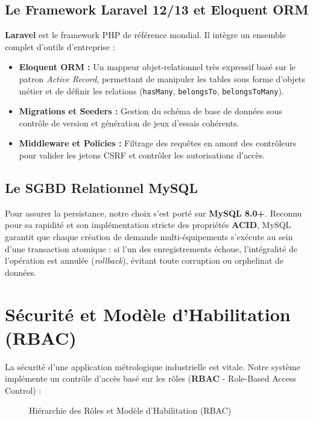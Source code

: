 \documentclass{bts-report}
\begin{document}
\subsection{Le Framework Laravel 12/13 et Eloquent ORM}
\textbf{Laravel} est le framework PHP de r\'ef\'erence mondial. Il int\`egre un ensemble complet d'outils d'entreprise :
\begin{itemize}
  \item \textbf{Eloquent ORM :} Un mappeur objet-relationnel tr\`es expressif bas\'e sur le patron \textit{Active Record}, permettant de manipuler les tables sous forme d'objets m\'etier et de d\'efinir les relations (\texttt{hasMany}, \texttt{belongsTo}, \texttt{belongsToMany}).
  \item \textbf{Migrations et Seeders :} Gestion du sch\'ema de base de donn\'ees sous contr\^ole de version et g\'en\'eration de jeux d'essais coh\'erents.
  \item \textbf{Middleware et Policies :} Filtrage des requ\^etes en amont des contr\^oleurs pour valider les jetons CSRF et contr\^oler les autorisations d'acc\`es.
\end{itemize}

\subsection{Le SGBD Relationnel MySQL}
Pour assurer la persistance, notre choix s'est port\'e sur \textbf{MySQL 8.0+}. Reconnu pour sa rapidit\'e et son impl\'ementation stricte des propri\'et\'es \textbf{ACID}, MySQL garantit que chaque cr\'eation de demande multi-\'equipements s'ex\'ecute au sein d'une transaction atomique : si l'un des enregistrements \'echoue, l'int\'egralit\'e de l'op\'eration est annul\'ee (\textit{rollback}), \'evitant toute corruption ou orphelinat de donn\'ees.

\section{S\'ecurit\'e et Mod\`ele d'Habilitation (RBAC)}
La s\'ecurit\'e d'une application m\'etrologique industrielle est vitale. Notre syst\`eme impl\'emente un contr\^ole d'acc\`es bas\'e sur les r\^oles (\textbf{RBAC} - Role-Based Access Control) :

\begin{figure}[H]
  \centering
  
  \caption{Hi\'erarchie des R\^oles et Mod\`ele d'Habilitation (RBAC)}
  \label{fig:rbac-model}
\end{figure}
\end{document}
